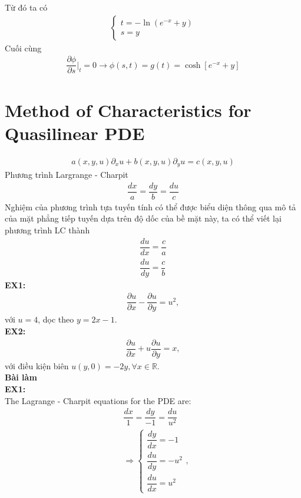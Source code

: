 \documentclass{article}
\newcommand{\f}[2]{\dfrac{#1}{#2}}
\newcommand{\at}[2]{\bigg\rvert_{#1}^{#2} }
\begin{document}
Từ đó ta có
\begin{gather}
	\begin{cases}
		t = -\ln(e^{-x} + y)\\
		s = y
	\end{cases}
\end{gather}
Cuối cùng 
\begin{gather}
	\f{\partial \phi}{\partial s} \at{t}{} = 0 \rightarrow \phi(s,t) = g(t) = \cosh \left[ e^{-x} + y \right]
\end{gather}
\section{Method of Characteristics for Quasilinear PDE}
\begin{gather}
	a(x,y,u) \partial_{x} u + b(x,y,u) \partial_{y} u = c(x,y,u)
\end{gather}
Phương trình Largrange - Charpit 
\begin{gather}
	\f{dx}{a} = \f{dy}{b} = \f{du}{c}
\end{gather}
Nghiệm của phương trình tựa tuyến tính có thể được biểu diện thông qua mô tả của mặt phẳng tiếp tuyến dựa trên độ dốc của bề mặt này, ta có thể viết lại phương trình LC thành
\begin{equation}
	\begin{aligned}
		\f{du}{dx} = \f{c}{a}\\
		\f{du}{dy} = \f{c}{b}
	\end{aligned}
\end{equation}
\textbf{EX1:}
\begin{align*}
	\f{\partial u}{\partial x} - \f{\partial u}{\partial y} = u^{2},
\end{align*}
với $u = 4$, dọc theo $y = 2x - 1$.\\
\textbf{EX2:}
\begin{align*}
	\f{\partial u}{\partial x} + u \f{\partial u}{\partial y} = x,
\end{align*}
với điều kiện biên $u(y,0) = -2y, \forall x \in \mathbb{R}$. \\
\textbf{Bài làm}\\
\textbf{EX1:}\\
The Lagrange - Charpit equations for the PDE are:
\begin{align*}
	& \f{dx}{1} = \f{dy}{-1} = \f{du}{u^{2}} \\
	&
	\Rightarrow
	\begin{cases}
		\f{dy}{dx} = -1     \\
		\f{du}{dy} = -u^{2} \\
		\f{du}{dx} = u^{2}
	\end{cases},
\end{align*}
\end{document}
